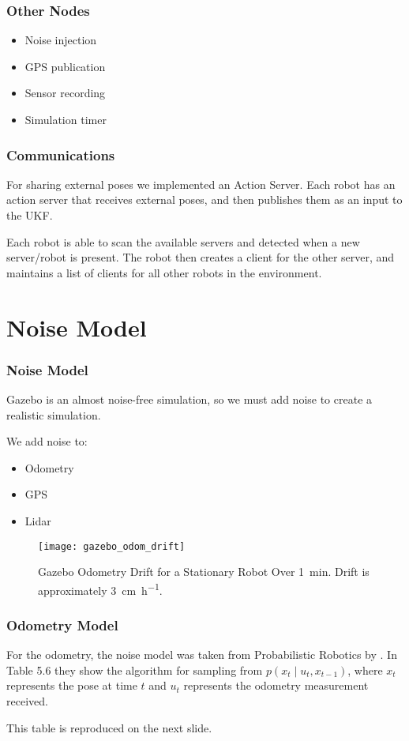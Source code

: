 \documentclass[14pt]{beamer}
\begin{document}
\begin{frame}
\frametitle{Other Nodes}
\begin{itemize}
\item Noise injection
\item GPS publication
\item Sensor recording
\item Simulation timer
\end{itemize}
\end{frame}

\begin{frame}
\frametitle{Communications}
For sharing external poses we implemented an Action Server. Each robot has an action server that receives external poses, and then publishes them as an input to the UKF.
\vspace{14pt}

Each robot is able to scan the available servers and detected when a new server/robot is present. The robot then creates a client for the other server, and maintains a list of clients for all other robots in the environment.
\end{frame}

\section{Noise Model}
\begin{frame}
\frametitle{Noise Model}
Gazebo is an almost noise-free simulation, so we must add noise to create a realistic simulation.

\vspace{14pt}
We add noise to:
\begin{itemize}
\item Odometry
\item GPS
\item Lidar
\end{itemize}
\end{frame}

\begin{frame}
\begin{figure}
\texttt{[image: gazebo\_odom\_drift]}
\caption{Gazebo Odometry Drift for a Stationary Robot Over \SI{1}{\minute}. Drift is approximately \SI{3}{\cm\per\hour}.}
\label{fig:gazebo_odom_drfit}
\end{figure}
\end{frame}

\begin{frame}
\frametitle{Odometry Model}
For the odometry, the noise model was taken from Probabilistic Robotics by \textcite{ProbabilisticRobotics}. In Table 5.6 they show the algorithm for sampling from $p(x_t \mid u_t, x_{t-1})$, where $x_t$ represents the pose at time $t$ and $u_t$ represents the odometry measurement received.

\vspace{14pt}
This table is reproduced on the next slide.

\end{frame}
\end{document}
